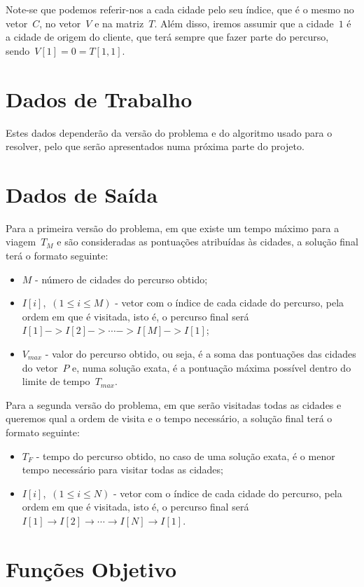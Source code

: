 \documentclass[12pt,a4paper,reqno]{report}
\numberwithin{figure}{section}
\numberwithin{equation}{section}
\begin{document}
Note-se que podemos referir-nos a cada cidade pelo seu índice, que é o mesmo no vetor~$C$, no vetor~$V$ e na matriz~$T$. Além disso, iremos assumir que a cidade~$1$ é a cidade de origem do cliente, que terá sempre que fazer parte do percurso, sendo~$V[1] = 0 = T[1,1]$.

\section{Dados de Trabalho}

Estes dados dependerão da versão do problema e do algoritmo usado para o resolver, pelo que serão apresentados numa próxima parte do projeto.

\section{Dados de Saída}

Para a primeira versão do problema, em que existe um tempo máximo para a viagem~$T_M$ e são consideradas as pontuações atribuídas às cidades, a solução final terá o formato seguinte:
\begin{itemize}
	\item $M$ - número de cidades do percurso obtido;
	\item $I[i]$,~$(1 \leq i \leq M)$ - vetor com o índice de cada cidade do percurso, pela ordem em que é visitada, isto é, o percurso final será~$I[1] -> I[2] -> \cdots -> I[M] -> I[1]$;
	\item $V_{max}$ - valor do percurso obtido, ou seja, é a soma das pontuações das cidades do vetor~$P$ e, numa solução exata, é a pontuação máxima possível dentro do limite de tempo~$T_{max}$.
\end{itemize}

Para a segunda versão do problema, em que serão visitadas todas as cidades e queremos qual a ordem de visita e o tempo necessário, a solução final terá o formato seguinte:
\begin{itemize}
	\item $T_F$ - tempo do percurso obtido, no caso de uma solução exata, é o menor tempo necessário para visitar todas as cidades;
	\item $I[i]$,~$(1 \leq i \leq N)$ - vetor com o índice de cada cidade do
	percurso, pela ordem em que é visitada, isto é, o percurso final será~$I[1]
	\rightarrow I[2] \rightarrow \cdots \rightarrow I[N] \rightarrow I[1]$.
\end{itemize}

\section{Funções Objetivo}
\end{document}
